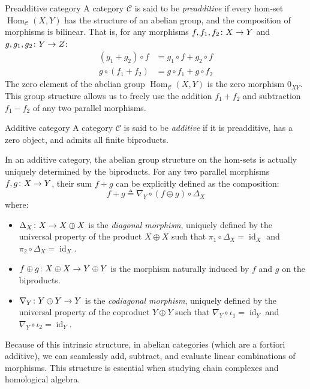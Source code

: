 \documentclass[a4paper]{article}
\begin{document}
\begin{snippetdefinition}{Preadditive category}
    A category \(\mathcal C\) is said to be \emph{preadditive} 
    if every hom-set \(\operatorname{Hom}_{\mathcal C}(X,Y)\) has the structure of an abelian group,
    and the composition of morphisms is bilinear.
    That is, for any morphisms \(f, f_1, f_2 \colon X \to Y\) and \(g, g_1, g_2 \colon Y \to Z\):
    \begin{align*}
        (g_1 + g_2) \circ f &= g_1 \circ f + g_2 \circ f \\
        g \circ (f_1 + f_2) &= g \circ f_1 + g \circ f_2
    \end{align*}
    The zero element of the abelian group \(\operatorname{Hom}_{\mathcal C}(X, Y)\) is the zero morphism \(0_{XY}\).
    This group structure allows us to freely use the addition \(f_1 + f_2\) and subtraction \(f_1 - f_2\) of any two parallel morphisms.
\end{snippetdefinition}

\begin{snippetdefinition}{Additive category}
    A category \(\mathcal C\) is said to be \emph{additive} if it is preadditive, has a zero object, and admits all finite biproducts.
\end{snippetdefinition}

In an additive category, the abelian group structure on the hom-sets is actually uniquely determined by the biproducts.
For any two parallel morphisms \(f, g \colon X \to Y\), their sum \(f + g\) can be explicitly defined as the composition:
\[
    f + g \triangleq \nabla_Y \circ (f \oplus g) \circ \Delta_X
\]
where:
\begin{itemize}
    \item \(\Delta_X \colon X \to X \oplus X\) is the \emph{diagonal morphism}, uniquely defined by the universal property of the product \(X \oplus X\) such that \(\pi_1 \circ \Delta_X = \operatorname{id}_X\) and \(\pi_2 \circ \Delta_X = \operatorname{id}_X\).
    \item \(f \oplus g \colon X \oplus X \to Y \oplus Y\) is the morphism naturally induced by \(f\) and \(g\) on the biproducts.
    \item \(\nabla_Y \colon Y \oplus Y \to Y\) is the \emph{codiagonal morphism}, uniquely defined by the universal property of the coproduct \(Y \oplus Y\) such that \(\nabla_Y \circ \iota_1 = \operatorname{id}_Y\) and \(\nabla_Y \circ \iota_2 = \operatorname{id}_Y\).
\end{itemize}
Because of this intrinsic structure, in abelian categories (which are a fortiori additive), we can seamlessly add, subtract, and evaluate linear combinations of morphisms. This structure is essential when studying chain complexes and homological algebra.
\end{document}
